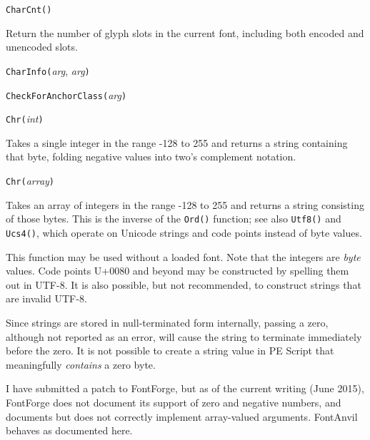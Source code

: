 
\texttt{CharCnt()}

Return the number of glyph slots in the current font, including both encoded
and unencoded slots.



\texttt{CharInfo(}\textit{arg}, \textit{arg}\texttt{)}



\texttt{CheckForAnchorClass(}\textit{arg}\texttt{)}



\texttt{Chr(}\textit{int}\texttt{)}

Takes a single integer in the range -128 to 255 and returns a string
containing that byte, folding negative values into two's complement
notation.

\noindent\texttt{Chr(}\textit{array}\texttt{)}

Takes an array of integers in the range -128 to 255 and returns a string
consisting of those bytes.  This is the inverse of the \texttt{Ord()}
function; see also \texttt{Utf8()} and \texttt{Ucs4()}, which operate on
Unicode strings and code points instead of byte values.

This function may be used without a loaded font.  Note that the integers are
\emph{byte} values.  Code points U+0080 and beyond may be constructed by
spelling them out in UTF-8.  It is also possible, but not recommended, to
construct strings that are invalid UTF-8.

Since strings are stored in null-terminated form internally, passing a zero,
although not reported as an error, will cause the string to terminate
immediately before the zero.  It is not possible to create a string value in
PE Script that meaningfully \emph{contains} a zero byte.

I \FFdiff have submitted a patch to FontForge, but as of the current writing
(June 2015), FontForge does not document its support of zero and
negative numbers,
and documents but does not correctly implement array-valued arguments. 
FontAnvil behaves as documented here.



